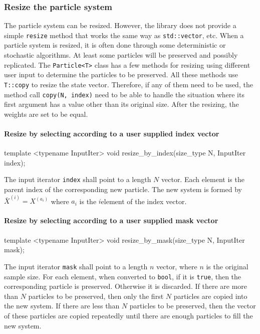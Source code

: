 \subsubsection{Resize the particle system}

The particle system can be resized. However, the library does not provide a
simple \verb|resize| method that works the same way as \verb|std::vector|, etc.
When a particle system is resized, it is often done through some deterministic
or stochastic algorithms. At least some particles will be preserved and
possibly replicated. The \verb|Particle<T>| class has a few methods for
resizing using different user input to determine the particles to be preserved.
All these methods use \verb|T::copy| to resize the state vector. Therefore, if
any of them need to be used, the method call \verb|copy(N, index)| need to be
able to handle the situation where its first argument has a value other than
its original size. After the resizing, the weights are set to be equal.

\paragraph{Resize by selecting according to a user supplied index vector}

\begin{cppcode}
  template <typename InputIter>
  void resize_by_index(size_type N, InputIter index);
\end{cppcode}
The input iterator \verb|index| shall point to a length $N$ vector. Each
element is the parent index of the corresponding new particle. The new system
is formed by $\bar{X}^{(i)} = X^{(a_i)}$ where $a_i$ is the $i$\ith element of
the index vector.

\paragraph{Resize by selecting according to a user supplied mask vector}

\begin{cppcode}
  template <typename InputIter>
  void resize_by_mask(size_type N, InputIter mask);
\end{cppcode}
The input iterator \verb|mask| shall point to a length $n$ vector, where $n$ is
the original sample size. For each element, when converted to \verb|bool|, if
it is \verb|true|, then the corresponding particle is preserved. Otherwise it
is discarded. If there are more than $N$ particles to be preserved, then only
the first $N$ particles are copied into the new system. If there are less than
$N$ particles to be preserved, then the vector of these particles are copied
repeatedly until there are enough particles to fill the new system.

